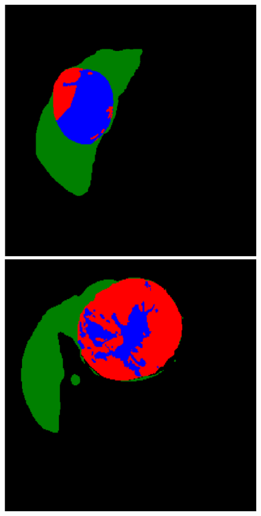 \begin{figure}[!ht]
\begin{minipage}{4cm}
\end{minipage}
\vspace{-0.2cm}
\begin{minipage}{4cm}
\includegraphics[width=\linewidth]{../SemanticSeg/images/1_7_gt_new_resized}
\end{minipage} \hspace{-0.3cm}
\begin{minipage}{4cm}
\includegraphics[width=\linewidth]{../SemanticSeg/images/2_3gt_resized}

\end{minipage}
\end{figure}
